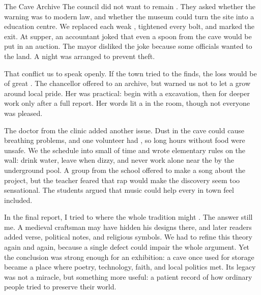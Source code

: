 \documentclass[12pt]{nextbook}
\begin{document}
\begin{readersection}{The Cave Archive}
The council did not want to remain . They asked whether the warning was  to modern law, and whether the museum could turn the site into a  education centre. We replaced each weak , tightened every bolt, and marked the exit. At supper, an accountant joked that even a spoon from the cave would be put in an auction. The mayor disliked the joke because some officials wanted to  the land. A night  was arranged to prevent theft.

That conflict  us to speak openly. If the town tried to  the finds, the loss would be of great . The chancellor offered to  an  archive, but warned us not to let a  grow around local pride. Her  was practical: begin with a  excavation, then  for deeper work only after a full report. Her words lit a  in the room, though not everyone was pleased.

The doctor from the clinic added another issue. Dust in the cave could cause  breathing problems, and one volunteer had , so long hours without food were unsafe. We  the schedule into small  of time and wrote elementary rules on the wall: drink water, leave when dizzy, and never work alone near the  by the underground pool. A  group from the school offered to make a song about the project, but the teacher feared that rap would make the discovery seem too sensational. The students argued that music could help every  in town feel included.

In the final report, I tried to  where the whole tradition might . The answer still  me. A medieval craftsman may have hidden his designs there, and later readers added verse, political notes, and religious symbols. We had to refine this theory again and again, because a single defect could impair the whole argument. Yet the conclusion was strong enough for an  exhibition: a cave once used for storage became a place where poetry, technology, faith, and local politics met. Its legacy was not a miracle, but something more useful: a patient record of how ordinary people tried to preserve their world.

\end{readersection}
\end{document}
